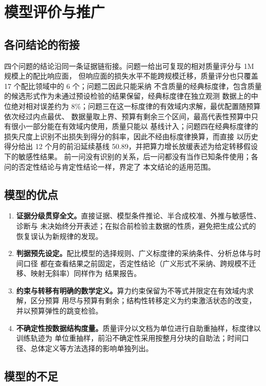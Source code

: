 \section{模型评价与推广}

\subsection{各问结论的衔接}

四个问题的结论沿同一条证据链衔接。问题一给出可复现的相对质量评分与 1M 规模上的配比响应面，
但响应面的损失水平不能跨规模迁移，质量评分也只覆盖 17 个配比领域中的 6 个；问题二因此只能采纳
不含质量的经典标度律，包含质量的候选形式作为未通过预设检验的结果保留，经典标度律在独立观测
数据上的中位绝对相对误差约为 8\%；问题三在这一标度律的有效域内求解，最优配置随预算依次经过内点最优、
数据量取上界、预算有剩余三个区间，最高代表性预算中只有很小一部分能在有效域内使用，质量只能以
基线计入；问题四在经典标度律的损失尺度上识别不出损失到得分的斜率，因此不经由标度律换算，而直接
以历史得分给出 12 个月的前沿延续基线 50.89，并把算力增长放缓表述为给定转移假设下的敏感性结果。
前一问没有识别的关系，后一问都没有当作已知条件使用；各问的否定性结论与肯定性结论一样，界定了
本文结论的适用范围。

\subsection{模型的优点}

\begin{enumerate}
  \item \textbf{证据分级贯穿全文。}直接证据、模型条件推论、半合成校准、外推与敏感性、诊断与
        未决始终分开表述；在拟合前检验主数据的性质，避免把生成公式的恢复误认为新规律的发现。
  \item \textbf{判据预先设定。}配比模型的选择规则、广义标度律的采纳条件、分析总体与时间口径
        都在查看结果之前固定，否定性结论（广义形式不采纳、跨规模不迁移、映射无斜率）同样作为
        结果报告。
  \item \textbf{约束与转移有明确的数学定义。}算力约束保留为不等式并限定在有效域内求解，区分预算
        用尽与预算有剩余；结构性转移定义为约束激活状态的改变，并以预算弹性的跳变检验。
  \item \textbf{不确定性按数据结构度量。}质量评分以文档为单位进行自助重抽样，标度律以训练轨迹为
        单位重抽样，前沿不确定性采用按整月分块的自助法；时间口径、总体定义等方法选择的影响单独列出。
\end{enumerate}

\subsection{模型的不足}

